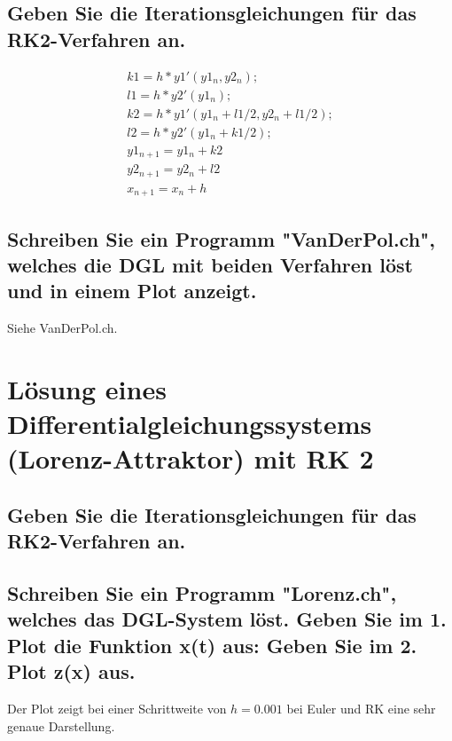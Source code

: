 \documentclass[10pt,a4paper]{article}
\begin{document}
\subsection{Geben Sie die Iterationsgleichungen für das RK2-Verfahren an.}

\begin{align}
k1 = h * y1'(y1_n, y2_n);
\\l1 = h * y2'(y1_n);
\\k2 = h * y1'(y1_n + l1/2, y2_n + l1/2);
\\l2 = h * y2'(y1_n + k1/2);
\\y1_{n+1} = y1_n + k2
\\y2_{n+1} = y2_n + l2
\\x_{n+1} = x_n + h
\end{align}

\subsection{Schreiben Sie ein Programm "VanDerPol.ch", welches die DGL mit beiden
Verfahren löst und in einem Plot anzeigt.}

Siehe VanDerPol.ch.

\section{Lösung eines Differentialgleichungssystems (Lorenz-Attraktor) mit RK 2}
\subsection{Geben Sie die Iterationsgleichungen für das RK2-Verfahren an.}
\subsection{Schreiben Sie ein Programm "Lorenz.ch", welches das DGL-System löst.
Geben Sie im 1. Plot die Funktion x(t) aus:
Geben Sie im 2. Plot z(x) aus.}

Der Plot zeigt bei einer Schrittweite von $h = 0.001$ bei Euler und RK eine sehr genaue Darstellung.
\end{document}
